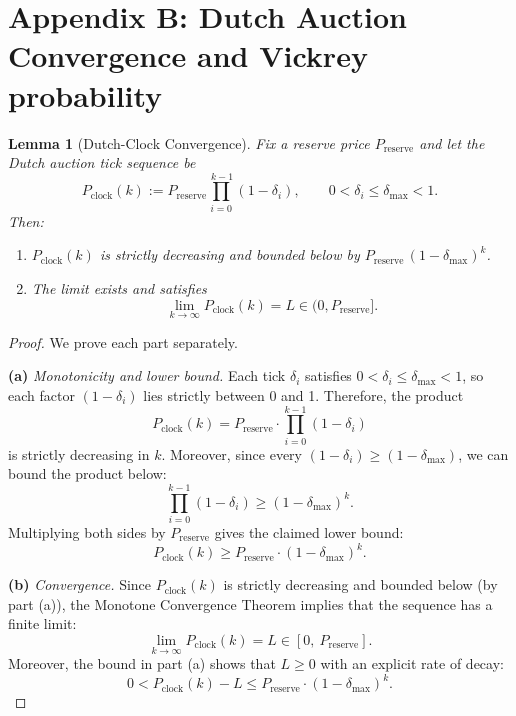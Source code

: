 \documentclass[11pt]{article}
\newtheorem{lemma}[theorem]{Lemma}
\begin{document}
\clearpage

\section*{Appendix B: Dutch Auction Convergence and Vickrey probability}

\begin{lemma}[Dutch-Clock Convergence]\label{lem:dutch_clock}
Fix a reserve price \(P_{\mathrm{reserve}}\) and let the Dutch auction
tick sequence be
\[
  P_{\mathrm{clock}}(k)
  := P_{\mathrm{reserve}}
     \prod_{i=0}^{\,k-1}\!(1-\delta_i),
  \qquad
  0<\delta_i\le\delta_{\max}<1 .
\]
Then:
\begin{enumerate}
\item[\textup{(a)}] \(P_{\mathrm{clock}}(k)\) is strictly
      decreasing and bounded below by
      \(P_{\mathrm{reserve}}\,(1-\delta_{\max})^{k}\).  
\item[\textup{(b)}] The limit exists and satisfies
\[
  \lim_{k\to\infty} P_{\mathrm{clock}}(k)
  = L \in (0, P_{\mathrm{reserve}}].
\]
\end{enumerate}
\end{lemma}
\begin{proof}
We prove each part separately.

\textbf{(a)} \emph{Monotonicity and lower bound.}  
Each tick $\delta_i$ satisfies $0 < \delta_i \le \delta_{\max} < 1$, so each factor $(1 - \delta_i)$ lies strictly between 0 and 1.  
Therefore, the product
\[
P_{\mathrm{clock}}(k) = P_{\mathrm{reserve}} \cdot \prod_{i=0}^{k-1}(1 - \delta_i)
\]
is strictly decreasing in $k$.  
Moreover, since every $(1 - \delta_i) \ge (1 - \delta_{\max})$, we can bound the product below:
\[
\prod_{i=0}^{k-1}(1 - \delta_i) \ge (1 - \delta_{\max})^k.
\]
Multiplying both sides by $P_{\mathrm{reserve}}$ gives the claimed lower bound:
\[
P_{\mathrm{clock}}(k) \ge P_{\mathrm{reserve}} \cdot (1 - \delta_{\max})^k.
\]

\textbf{(b)} \emph{Convergence.}  
Since $P_{\mathrm{clock}}(k)$ is strictly decreasing and bounded below (by part (a)), the Monotone Convergence Theorem implies that the sequence has a finite limit:
\[
\lim_{k \to \infty} P_{\mathrm{clock}}(k) = L \in \left[0,\ P_{\mathrm{reserve}}\right].
\]
Moreover, the bound in part (a) shows that $L \ge 0$ with an explicit rate of decay:
\[
0 < P_{\mathrm{clock}}(k) - L \le P_{\mathrm{reserve}} \cdot (1 - \delta_{\max})^k.
\]
\end{proof}
\end{document}

